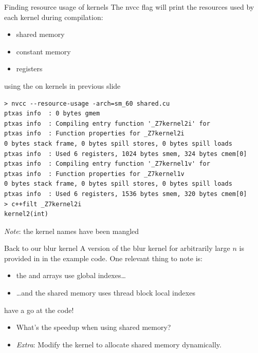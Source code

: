 \documentclass[aspectratio=43]{beamer}
\begin{document}
\begin{frame}[fragile]{Finding resource usage of kernels}
    The nvcc flag  will print the resources used by each kernel during compilation:
    \begin{itemize}
        \item shared memory
        \item constant memory
        \item registers
    \end{itemize}

    \begin{terminal}{using the  on kernels in previous slide}
    \begin{lstlisting}[style=terminal]
> nvcc --resource-usage -arch=sm_60 shared.cu 
ptxas info  : 0 bytes gmem
ptxas info  : Compiling entry function '_Z7kernel2i' for
ptxas info  : Function properties for _Z7kernel2i
0 bytes stack frame, 0 bytes spill stores, 0 bytes spill loads
ptxas info  : Used 6 registers, 1024 bytes smem, 324 bytes cmem[0]
ptxas info  : Compiling entry function '_Z7kernel1v' for
ptxas info  : Function properties for _Z7kernel1v
0 bytes stack frame, 0 bytes spill stores, 0 bytes spill loads
ptxas info  : Used 6 registers, 1536 bytes smem, 320 bytes cmem[0]
> c++filt _Z7kernel2i
kernel2(int)
    \end{lstlisting}
    \end{terminal}
    \emph{Note}: the kernel names have been mangled

\end{frame}

\begin{frame}[fragile]{Back to our blur kernel}
        A version of the blur kernel for arbitrarily large $n$ is provided in  in the example code. One relevant thing to note is:
        \begin{itemize}
            \item  the  and  arrays use global indexes\dots
            \item  \dots and the shared memory uses thread block local indexes
        \end{itemize}

    \begin{info}{have a go at the code!}
        \begin{itemize}
            \item What's the speedup when using shared memory?
            \item \emph{Extra}: Modify the  kernel to allocate shared memory dynamically.
        \end{itemize}
    \end{info}

\end{frame}
\end{document}
